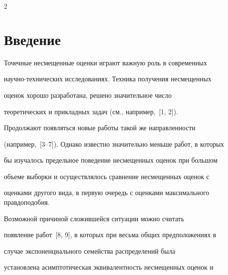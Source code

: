 









      \thispagestyle{headings}





      \begin{multicols}{2}





      \label{st\stat}





\section{Введение}





  Точечные несмещенные оценки играют важную роль в современных


  научно-технических исследованиях. Техника получения несмещенных


  оценок хорошо разработана, решено значительное число


  теоретических и прикладных задач (см., например,~[1, 2]).


  Продолжают появляться новые работы  такой же направленности


  (например,~[3--7]). Однако известно значительно меньше работ, в которых


  бы изучалось предельное поведение несмещенных оценок при большом


  объеме выборки и осуществлялось сравнение несмещенных оценок с


  оценками другого вида, в первую очередь с оценками максимального правдоподобия.


  Возможной причиной сложившейся ситуации можно считать


  появление работ~[8, 9], в которых при весьма общих предположениях в


  случае экспоненциального семейства распределений была


  установлена асимптотическая эквивалентность несмещенных оценок и



\end{multicols}
